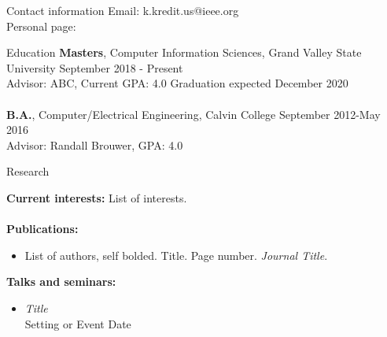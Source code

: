 \documentclass{resume} %
\begin{document}

\begin{rSection}{Contact information}
Email: k.kredit.us@ieee.org \\
Personal page: \url{}
\end{rSection}


\begin{rSection}{Education}
{\bf Masters}, Computer Information Sciences, Grand Valley State University
    \hfill {September 2018 - Present} \\
    Advisor: ABC, Current GPA: 4.0 \hfill{Graduation expected December 2020} \\
\\
{\bf B.A.}, Computer/Electrical Engineering, Calvin College \hfill {September 2012-May 2016} \\
    Advisor: Randall Brouwer, GPA: 4.0
\end{rSection}


\begin{rSection}{Research}

{\bf Current interests:} List of interests. \\
\\

{\bf Publications:}
\begin{itemize}

\item List of authors, self bolded. {Title}. Page number. {\em Journal Title}. \url{}

\end{itemize}


{\bf Talks and seminars:}
\begin{itemize}[itemsep = -3pt]

\item \textit{Title} \\ Setting or Event \hfill {Date}

\end{itemize}


\end{rSection}
\end{document}
